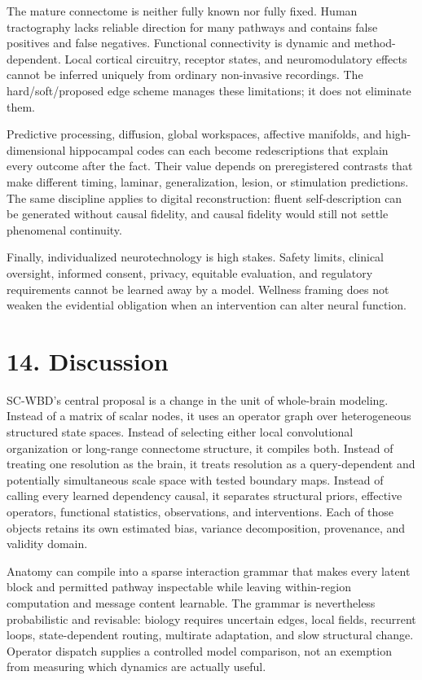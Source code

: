The mature connectome is neither fully known nor fully fixed. Human
tractography lacks reliable direction for many pathways and contains false
positives and false negatives. Functional connectivity is dynamic and
method-dependent. Local cortical circuitry, receptor states, and
neuromodulatory effects cannot be inferred uniquely from ordinary non-invasive
recordings. The hard/soft/proposed edge scheme manages these limitations; it
does not eliminate them.

Predictive processing, diffusion, global workspaces, affective manifolds, and
high-dimensional hippocampal codes can each become redescriptions that explain
every outcome after the fact. Their value depends on preregistered contrasts
that make different timing, laminar, generalization, lesion, or stimulation
predictions. The same discipline applies to digital reconstruction: fluent
self-description can be generated without causal fidelity, and causal
fidelity would still not settle phenomenal continuity.

Finally, individualized neurotechnology is high stakes. Safety limits,
clinical oversight, informed consent, privacy, equitable evaluation, and
regulatory requirements cannot be learned away by a model. Wellness framing
does not weaken the evidential obligation when an intervention can alter
neural function.

\section{14. Discussion}

SC-WBD's central proposal is a change in the unit of whole-brain modeling.
Instead of a matrix of scalar nodes, it uses an operator graph over
heterogeneous structured state spaces. Instead of selecting either local
convolutional organization or long-range connectome structure, it compiles
both. Instead of treating one resolution as the brain, it treats resolution
as a query-dependent and potentially simultaneous scale space with tested
boundary maps. Instead of calling every learned dependency causal, it
separates structural priors, effective operators, functional statistics,
observations, and interventions. Each of those objects retains its own
estimated bias, variance decomposition, provenance, and validity domain.

Anatomy can compile into a sparse interaction grammar that makes every latent
block and permitted pathway inspectable while leaving within-region
computation and message content learnable. The grammar is nevertheless
probabilistic and revisable: biology requires uncertain edges, local fields,
recurrent loops, state-dependent routing, multirate adaptation, and slow
structural change. Operator dispatch supplies a controlled model comparison,
not an exemption from measuring which dynamics are actually useful.

